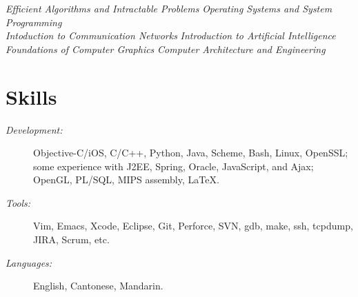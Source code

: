 \documentclass[margin,line]{res}
\newcommand{\sstyle}{\sc}
\begin{document}
\begin{resume}


  {\sl Efficient Algorithms and Intractable Problems}\hspace{.5in}
  {\sl Operating Systems and System Programming}\vspace{.05in}\\
  {\sl Intoduction to Communication Networks}\hspace{.82in}
  {\sl Introduction to Artificial Intelligence}\vspace{.05in}\\
  {\sl Foundations of Computer Graphics}\hspace{1.14in}
  {\sl Computer Architecture and Engineering}\vspace{.05in}\\

  \section{\sstyle Skills}
  \begin{description}
  \item[{\it Development:}] Objective-C/iOS, C/C++, Python, Java, Scheme, Bash, Linux, OpenSSL;
    some experience with J2EE, Spring, Oracle, JavaScript, and Ajax;
    OpenGL, PL/SQL, MIPS assembly, \LaTeX{}.
  \item[{\it Tools:}] Vim, Emacs, Xcode, Eclipse, Git, Perforce, SVN, gdb, make, ssh, tcpdump, JIRA, Scrum, etc.
  \item[{\it Languages:}] English, Cantonese, Mandarin.
  \end{description}


\end{resume}
\end{document}
